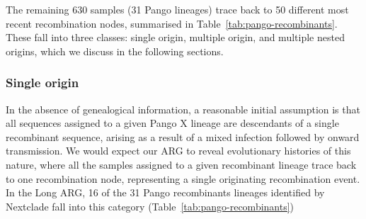 \documentclass{article}
\begin{document}
The remaining 630 samples (31 Pango lineages) trace back to 50 different
most recent recombination nodes, summarised
in Table~\ref{tab:pango-recombinants}.
These fall into three classes: single origin, multiple origin,
and multiple nested origins, which we discuss in the following sections.

\subsubsection{Single origin}
In the absence of genealogical information, a reasonable initial assumption is
that all sequences
assigned to a given Pango X lineage are descendants of a single recombinant
sequence, arising as a result of a mixed infection followed by onward
transmission. We would expect our ARG to reveal evolutionary histories of this
nature, where all the samples assigned to a given recombinant lineage
trace back to one recombination node, representing a single originating
recombination event. In the Long ARG, 16 of the 31 Pango recombinants lineages identified by Nextclade
fall into this category (Table~\ref{tab:pango-recombinants})
\end{document}
